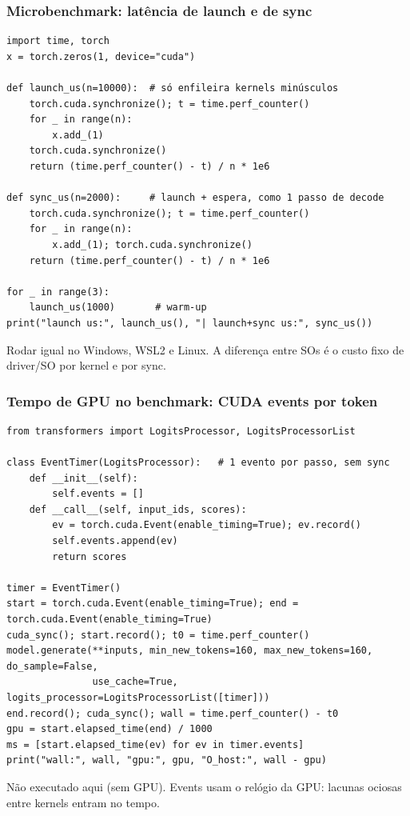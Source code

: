 \documentclass[11pt, aspectratio=169, usepdftitle=false]{beamer}
\begin{document}
\begin{frame}[fragile]
\frametitle{Microbenchmark: latência de launch e de sync}
\begin{lstlisting}
import time, torch
x = torch.zeros(1, device="cuda")

def launch_us(n=10000):  # só enfileira kernels minúsculos
    torch.cuda.synchronize(); t = time.perf_counter()
    for _ in range(n):
        x.add_(1)
    torch.cuda.synchronize()
    return (time.perf_counter() - t) / n * 1e6

def sync_us(n=2000):     # launch + espera, como 1 passo de decode
    torch.cuda.synchronize(); t = time.perf_counter()
    for _ in range(n):
        x.add_(1); torch.cuda.synchronize()
    return (time.perf_counter() - t) / n * 1e6

for _ in range(3):
    launch_us(1000)       # warm-up
print("launch us:", launch_us(), "| launch+sync us:", sync_us())
\end{lstlisting}
{\footnotesize Rodar igual no Windows, WSL2 e Linux. A diferença entre SOs é o custo fixo de driver/SO por kernel e por sync.}
\end{frame}

\begin{frame}[fragile]
\frametitle{Tempo de GPU no benchmark: CUDA events por token}
\begin{lstlisting}
from transformers import LogitsProcessor, LogitsProcessorList

class EventTimer(LogitsProcessor):   # 1 evento por passo, sem sync
    def __init__(self):
        self.events = []
    def __call__(self, input_ids, scores):
        ev = torch.cuda.Event(enable_timing=True); ev.record()
        self.events.append(ev)
        return scores

timer = EventTimer()
start = torch.cuda.Event(enable_timing=True); end = torch.cuda.Event(enable_timing=True)
cuda_sync(); start.record(); t0 = time.perf_counter()
model.generate(**inputs, min_new_tokens=160, max_new_tokens=160, do_sample=False,
               use_cache=True, logits_processor=LogitsProcessorList([timer]))
end.record(); cuda_sync(); wall = time.perf_counter() - t0
gpu = start.elapsed_time(end) / 1000
ms = [start.elapsed_time(ev) for ev in timer.events]
print("wall:", wall, "gpu:", gpu, "O_host:", wall - gpu)
\end{lstlisting}
{\footnotesize Não executado aqui (sem GPU). Events usam o relógio da GPU: lacunas ociosas entre kernels entram no tempo.}
\end{frame}
\end{document}
